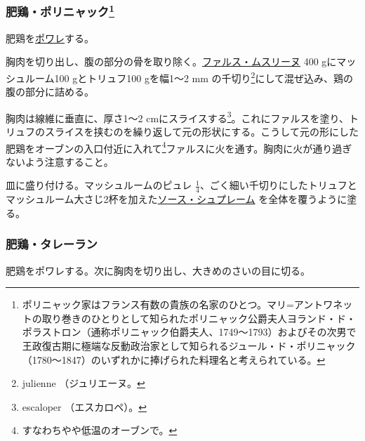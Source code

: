 \hypertarget{poularde-polignac}{%
\subsubsection[肥鶏・ポリニャック]{\texorpdfstring{肥鶏・ポリニャック\footnote{ポリニャック家はフランス有数の貴族の名家のひとつ。マリ=アントワネットの取り巻きのひとりとして知られたポリニャック公爵夫人ヨランド・ド・ポラストロン（通称ポリニャック伯爵夫人、1749〜1793）およびその次男で王政復古期に極端な反動政治家として知られるジュール・ド・ポリニャック（1780〜1847）のいずれかに捧げられた料理名と考えられている。}}{肥鶏・ポリニャック}}\label{poularde-polignac}}


肥鶏を\protect\hyperlink{les-poeles}{ポワレ}する。

胸肉を切り出し、腹の部分の骨を取り除く。\protect\hyperlink{farce-c}{ファルス・ムスリーヌ}
400 gにマッシュルーム100 gとトリュフ100 gを幅1〜2 mm の千切り\footnote{julienne
  （ジュリエーヌ。}にして混ぜ込み、鶏の腹の部分に詰める。

胸肉は線維に垂直に、厚さ1〜2 cmにスライスする\footnote{escaloper
  （エスカロペ）。}。これにファルスを塗り、トリュフのスライスを挟むのを繰り返して元の形状にする。こうして元の形にした肥鶏をオーブンの入口付近に入れて\footnote{すなわちやや低温のオーブンで。}ファルスに火を通す。胸肉に火が通り過ぎないよう注意すること。

皿に盛り付ける。マッシュルームのピュレ
\(\frac{1}{4}\)、ごく細い千切りにしたトリュフとマッシュルーム大さじ2杯を加えた\protect\hyperlink{sauce-supreme}{ソース・シュプレーム}
を全体を覆うように塗る。

\hypertarget{poularde-talleyrand}{%
\subsubsection{肥鶏・タレーラン}\label{poularde-talleyrand}}


肥鶏をポワレする。次に胸肉を切り出し、大きめのさいの目に切る。


